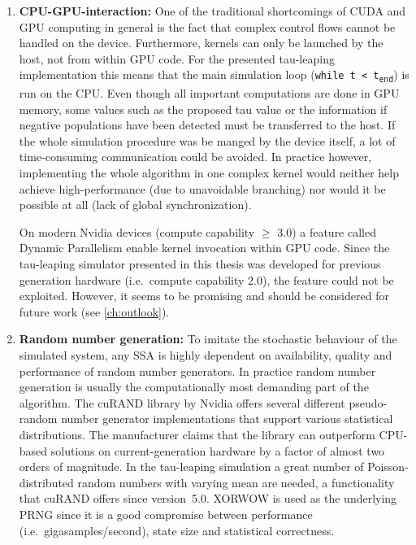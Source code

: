 \begin{enumerate}
\item \textbf{CPU-GPU-interaction:} One of the traditional shortcomings of CUDA and GPU computing in general is the fact that complex control flows cannot be handled on the device. Furthermore, kernels can only be launched by the host, not from within GPU code. For the presented tau-leaping implementation this means that the main simulation loop (\texttt{while t < t\textsubscript{end}}) is run on the CPU. Even though all important computations are done in GPU memory, some values such as the proposed tau value or the information if negative populations have been detected must be transferred to the host. If the whole simulation procedure was be manged by the device itself, a lot of time-consuming communication could be avoided. In practice however, implementing the whole algorithm in one complex kernel would neither help achieve high-performance (due to unavoidable branching) nor would it be possible at all (lack of global synchronization). 

On modern Nvidia devices (compute capability $\geq$ 3.0) a feature called Dynamic Parallelism enable kernel invocation within GPU code. Since the tau-leaping simulator presented in this thesis was developed for previous generation hardware (i.e.\ compute capability 2.0), the feature could not be exploited. However, it seems to be promising and should be considered for future work (see \ref{ch:outlook}). 

\item \textbf{Random number generation:} To imitate the stochastic behaviour of the simulated system, any SSA is highly dependent on availability, quality and performance of random number generators. In practice random number generation is usually the computationally most demanding part of the algorithm. The cuRAND library by Nvidia offers several different pseudo-random number generator implementations that support various statistical distributions. The manufacturer claims that the library can outperform CPU-based solutions on current-generation hardware by a factor of almost two orders of magnitude. In the tau-leaping simulation a great number of Poisson-distributed random numbers with varying mean are needed, a functionality that cuRAND offers since version~5.0. XORWOW \cite{saito_variants_2010} is used as the underlying PRNG since it is a good compromise between performance (i.e.\ gigasamples/second), state size and statistical correctness. 


\end{enumerate}
